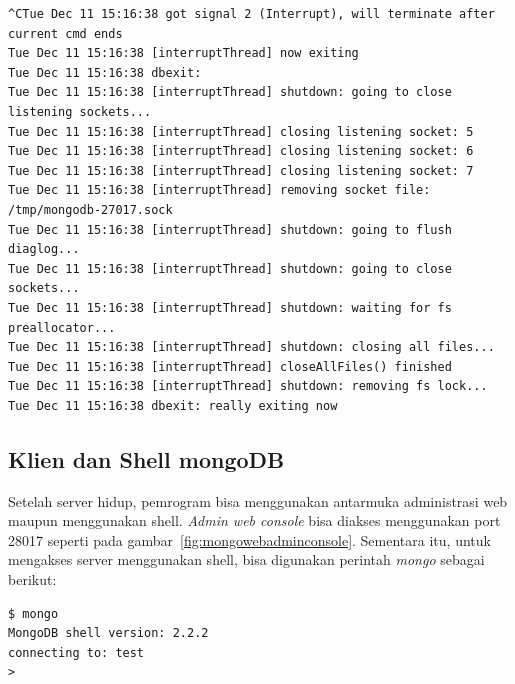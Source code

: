 \lstset{language=bash,caption=Mengakhiri server MongoDB (mongod)}
\begin{lstlisting}
^CTue Dec 11 15:16:38 got signal 2 (Interrupt), will terminate after current cmd ends
Tue Dec 11 15:16:38 [interruptThread] now exiting
Tue Dec 11 15:16:38 dbexit: 
Tue Dec 11 15:16:38 [interruptThread] shutdown: going to close listening sockets...
Tue Dec 11 15:16:38 [interruptThread] closing listening socket: 5
Tue Dec 11 15:16:38 [interruptThread] closing listening socket: 6
Tue Dec 11 15:16:38 [interruptThread] closing listening socket: 7
Tue Dec 11 15:16:38 [interruptThread] removing socket file: /tmp/mongodb-27017.sock
Tue Dec 11 15:16:38 [interruptThread] shutdown: going to flush diaglog...
Tue Dec 11 15:16:38 [interruptThread] shutdown: going to close sockets...
Tue Dec 11 15:16:38 [interruptThread] shutdown: waiting for fs preallocator...
Tue Dec 11 15:16:38 [interruptThread] shutdown: closing all files...
Tue Dec 11 15:16:38 [interruptThread] closeAllFiles() finished
Tue Dec 11 15:16:38 [interruptThread] shutdown: removing fs lock...
Tue Dec 11 15:16:38 dbexit: really exiting now
\end{lstlisting}

\subsection{Klien dan Shell mongoDB}

Setelah server hidup, pemrogram bisa menggunakan antarmuka administrasi web maupun menggunakan shell. \textit{Admin web console} bisa diakses menggunakan port 28017 seperti pada gambar~\ref{fig:mongowebadminconsole}. Sementara itu, untuk mengakses server menggunakan shell, bisa digunakan perintah \textit{mongo} sebagai berikut:

\lstset{language=bash,caption=Shell mongoDB (mongo)}
\begin{lstlisting}
$ mongo
MongoDB shell version: 2.2.2
connecting to: test
> 
\end{lstlisting}

